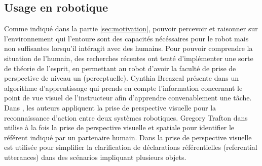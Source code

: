 \documentclass[a4paper,11pt,twoside]{StyleThese}
\begin{document}





\subsection{Usage en robotique}

Comme indiqué dans la partie \ref{sec:motivation}, pouvoir percevoir et raisonner sur l'environnement qui l'entoure sont des capacités nécéssaires pour le robot mais non suffisantes lorsqu'il intéragit avec des humains. Pour pouvoir comprendre la situation de l'humain, des recherches récentes ont tenté d'implémenter une sorte de théorie de l'esprit, en permettant au robot d'avoir la faculté de prise de perspective de niveau un (perceptuelle). Cynthia Breazeal présente dans \cite{breazeal2006} un algorithme d'apprentissage qui prends en compte l'information concernant le point de vue visuel de l'instructeur afin d'apprendre convenablement une tâche. Dans \cite{Johnson2005}, les auteurs appliquent la prise de perspective visuelle pour la reconnaissance d'action entre deux systèmes robotiques. Gregory Trafton dans \cite{Trafton2005} utilise à la fois la prise de perspective visuelle et spatiale pour identifier le référent indiqué par un partenaire humain. Dans \cite{ros2010one} la prise de perspective visuelle est utilisée pour simplifier la clarification de déclarations référentielles (referential utterances) dans des scénarios impliquant plusieurs objets.
\end{document}
